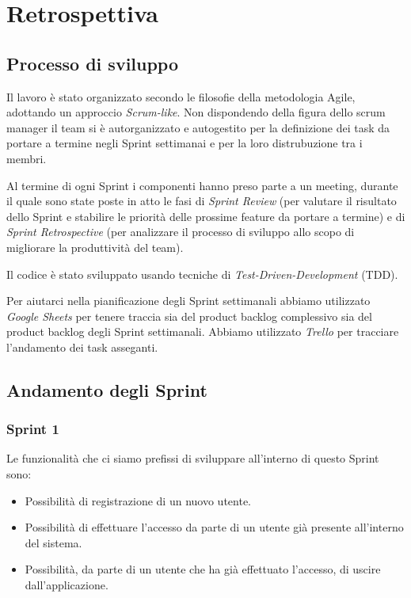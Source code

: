 \chapter{Retrospettiva}

\section{Processo di sviluppo}

Il lavoro è stato organizzato secondo le filosofie della metodologia Agile, adottando un approccio \textit{Scrum-like}.
%
Non dispondendo della figura dello scrum manager il team si è autorganizzato e autogestito per la definizione dei task da portare a termine negli Sprint settimanai e per la loro distrubuzione tra i membri.

Al termine di ogni Sprint i componenti hanno preso parte a un meeting, durante il quale sono state poste in atto le fasi di \textit{Sprint Review} (per valutare il risultato dello Sprint e stabilire le priorità delle prossime feature da portare a termine) e di \textit{Sprint Retrospective} (per analizzare il processo di sviluppo allo scopo di migliorare la produttività del team).

Il codice è stato sviluppato usando tecniche di \textit{Test-Driven-Development} (TDD).

Per aiutarci nella pianificazione degli Sprint settimanali abbiamo utilizzato \textit{Google Sheets} per tenere traccia sia del product backlog complessivo sia del product backlog degli Sprint settimanali.
%
Abbiamo utilizzato \textit{Trello} per tracciare l'andamento dei task asseganti.

\section{Andamento degli Sprint}

\subsection{Sprint 1}

Le funzionalità che ci siamo prefissi di sviluppare all'interno di questo Sprint sono:

\begin{itemize}
%
    \item Possibilità di registrazione di un nuovo utente.
%
    \item Possibilità di effettuare l'accesso da parte di un utente già presente all'interno del sistema.
%
    \item Possibilità, da parte di un utente che ha già effettuato l'accesso, di uscire dall'applicazione.
%
\end{itemize}

